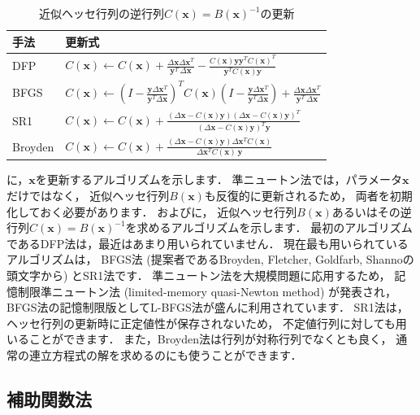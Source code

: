 \begin{table}[t]
\centering
\caption{近似ヘッセ行列の逆行列$C(\bm{x}) = B(\bm{x})^{-1}$の更新}
\label{tab:inv_hessian_update}
\begin{tabular}{l|l}
\hline
手法 & 更新式
\\
\hline
DFP 
&
$\displaystyle C(\bm{x}) \gets \displaystyle C(\bm{x}) + \frac {\Delta\bm{x} \Delta\bm{x}^T}{\bm{y}^{T} \, \Delta\bm{x}} - \frac {C(\bm{x}) \bm{y} \bm{y}^T C(\bm{x})^T} {\bm{y}^T C(\bm{x}) \bm{y}}$
\parbox[c][9.5mm][c]{0cm}{}\\
BFGS
&
$\displaystyle C(\bm{x}) \gets \left (I-\frac {\bm{y} \Delta\bm{x}^T} {\bm{y}^T \Delta\bm{x}} \right )^T C(\bm{x}) \left (I-\frac { \bm{y} \Delta\bm{x}^T} {\bm{y}^T \Delta\bm{x}} \right )+\frac
{\Delta\bm{x} \Delta\bm{x}^T} {\bm{y}^T \, \Delta\bm{x}}$
\parbox[c][9.5mm][c]{0cm}{}\\
SR1
&
$\displaystyle C(\bm{x}) \gets C(\bm{x})+\frac {(\Delta\bm{x}-C(\bm{x}) \bm{y}) (\Delta\bm{x}-C(\bm{x}) \bm{y})^T}{(\Delta\bm{x}-C(\bm{x}) \bm{y})^T \bm{y}}$
\parbox[c][9.5mm][c]{0cm}{}\\
Broyden
&
$\displaystyle C(\bm{x}) \gets C(\bm{x})+\frac {(\Delta\bm{x}-C(\bm{x}) \bm{y}) \Delta\bm{x}^T C(\bm{x})}{\Delta\bm{x}^T C(\bm{x}) \, \bm{y}}$
\parbox[c][9.5mm][c]{0cm}{}\\
\hline
\end{tabular}
\end{table}

に，$\bm{x}$を更新するアルゴリズムを示します．
準ニュートン法では，パラメータ$\bm{x}$だけではなく，
近似ヘッセ行列$B(\bm{x})$も反復的に更新されるため，
両者を初期化しておく必要があります．
およびに，
近似ヘッセ行列$B(\bm{x})$あるいはその逆行列$C(\bm{x}) = B(\bm{x})^{-1}$を求めるアルゴリズムを示します．
最初のアルゴリズムであるDFP法は，最近はあまり用いられていません．
現在最も用いられているアルゴリズムは，
BFGS法 (提案者であるBroyden, Fletcher, Goldfarb, Shannoの頭文字から) とSR1法です．
準ニュートン法を大規模問題に応用するため，
記憶制限準ニュートン法 (limited-memory quasi-Newton method) が発表され，
BFGS法の記憶制限版としてL-BFGS法が盛んに利用されています．
SR1法は，ヘッセ行列の更新時に正定値性が保存されないため，
不定値行列に対しても用いることができます．
また，Broyden法は行列が対称行列でなくとも良く，
通常の連立方程式の解を求めるのにも使うことができます．

\subsection{補助関数法}
\label{sec:auxiliary_function}

